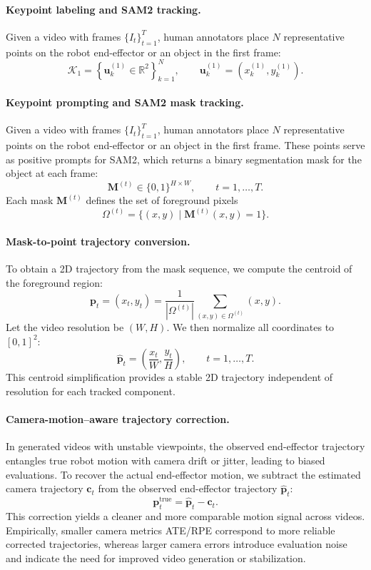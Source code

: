 \paragraph{Keypoint labeling and SAM2 tracking.}
Given a video with frames $\{I_t\}_{t=1}^{T}$, human annotators place $N$ representative points on the robot end-effector or an object in the first frame:
\[
    \mathcal{K}_1 = \left\{
        \mathbf{u}_k^{(1)} \in \mathbb{R}^2
    \right\}_{k=1}^{N}, 
    \qquad 
    \mathbf{u}_k^{(1)} = (x_k^{(1)}, y_k^{(1)}).
\]
\paragraph{Keypoint prompting and SAM2 mask tracking.}
Given a video with frames $\{I_t\}_{t=1}^{T}$, human annotators place $N$ representative points on the robot end-effector or an object in the first frame. These points serve as positive prompts for SAM2, which returns a binary segmentation mask for the object at each frame:
\[
    \mathbf{M}^{(t)} \in \{0,1\}^{H \times W}, 
    \qquad t = 1,\dots,T.
\]
Each mask $\mathbf{M}^{(t)}$ defines the set of foreground pixels
\[
    \Omega^{(t)} = 
    \big\{ (x,y) \;\big|\; \mathbf{M}^{(t)}(x,y)=1 \big\}.
\]

\paragraph{Mask-to-point trajectory conversion.}
To obtain a 2D trajectory from the mask sequence, we compute the centroid of the foreground region:
\[
    \mathbf{p}_t
    = (x_t, y_t) =
    \frac{1}{|\Omega^{(t)}|}
    \sum_{(x,y)\in\Omega^{(t)}} 
    (x,y).
\]
Let the video resolution be $(W,H)$. We then normalize all coordinates to $[0,1]^2$:
\[
    \hat{\mathbf{p}}_t
    =
    \left(
        \frac{x_t}{W},
        \frac{y_t}{H}
    \right),
    \qquad t = 1,\dots,T.
\]
This centroid simplification provides a stable 2D trajectory independent of resolution for each tracked component.


\paragraph{Camera-motion–aware trajectory correction.}
In generated videos with unstable viewpoints, the observed end-effector trajectory entangles true robot motion with camera drift or jitter, leading to biased evaluations. To recover the actual end-effector motion, we subtract the estimated camera trajectory $\mathbf{c}_t$ from the observed end-effector trajectory $\hat{\mathbf{p}}_t$:
\[
    \mathbf{p}_t^{\mathrm{true}}
    =
    \hat{\mathbf{p}}_t - \mathbf{c}_t.
\]
This correction yields a cleaner and more comparable motion signal across videos. Empirically, smaller camera metrics ATE/RPE correspond to more reliable corrected trajectories, whereas larger camera errors introduce evaluation noise and indicate the need for improved video generation or stabilization.

